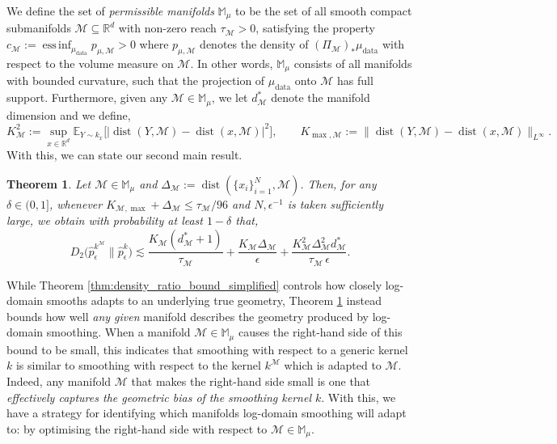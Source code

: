 \documentclass[10pt]{article}
\theoremstyle{plain}
\newtheorem{theorem}{Theorem}[section]
\theoremstyle{definition}
\theoremstyle{remark}
\newcommand{\M}{{\mathcal{M}}}
\newcommand{\R}{\mathbb{R}}
\newcommand{\E}{\mathbb{E}}
\newcommand{\mud}{\mu_{\operatorname{data}}}
\newcommand{\dist}{\operatorname{dist}}
\newcommand{\gap}{\Delta_\M}
\begin{document}
We define the set of \textit{permissible manifolds} \(\mathbb{M}_\mu\) to be the set of all smooth compact submanifolds \(\M \subseteq \R^d\) with non-zero reach \(\tau_\M > 0\), satisfying the property \(c_\M := \operatorname{ess \, inf}_{\mud} p_{\mu, \M} > 0\) where \(p_{\mu, \M}\) denotes the density of \((\Pi_\M)_* \mud\) with respect to the volume measure on \(\M\). In other words, \(\mathbb{M}_\mu\) consists of all manifolds with bounded curvature, such that the projection of \(\mud\) onto \(\M\) has full support. Furthermore, given any \(\M \in \mathbb{M}_\mu\), we let \(d^*_\M\) denote the manifold dimension and we define,
\begin{equation*}
    K_\M^2 := \sup_{x \in \R^d} \E_{Y \sim k_x} \big [ | \dist(Y, \M) - \dist(x, \M) |^2 \big ], \qquad K_{\max, \M} := \| \dist(Y, \M) - \dist(x, \M) \|_{L^\infty}.
\end{equation*}
With this, we can state our second main result.

\begin{theorem}
\label{thm:geometric_bias}
Let \(\M \in \mathbb{M}_{\mu}\) and \(\Delta_\M := \dist(\{x_i\}_{i=1}^N, \M)\). Then, for any \(\delta \in (0, 1]\), whenever \(K_{\M, \max} + \gap \leq \tau_\M/96\) and \(N, \epsilon^{-1}\) is taken sufficiently large, we obtain with probability at least \(1 - \delta\) that,
\begin{equation}\label{eq:geometric_bias_00}
    D_2 \big ( \hat{p}_\epsilon^{k^{\M}} \big \| \hat{p}^k_\epsilon \big ) \lesssim \frac{K_\M (d_\M^* + 1)}{\tau_\M} + \frac{K_\M \gap}{\epsilon} + \frac{K_\M^2 \gap^2 d_\M^*}{\tau_\M \, \epsilon}.
\end{equation}
\end{theorem}

While Theorem \ref{thm:density_ratio_bound_simplified} controls how closely log-domain smooths adapts to an underlying true geometry, Theorem \ref{thm:geometric_bias} instead bounds how well \emph{any given} manifold describes the geometry produced by log-domain smoothing. When a manifold \(\M \in \mathbb{M}_\mu\) causes the right-hand side of this bound to be small, this indicates that smoothing with respect to a generic kernel \(k\) is similar to smoothing with respect to the kernel \(k^\M\) which is adapted to \(\M\). Indeed, any manifold \(\M\) that makes the right-hand side small is one that \emph{effectively captures the geometric bias of the smoothing kernel \(k\)}. With this, we have a strategy for identifying which manifolds log-domain smoothing will adapt to: by optimising the right-hand side with respect to \(\M \in \mathbb{M}_\mu\).
\end{document}
